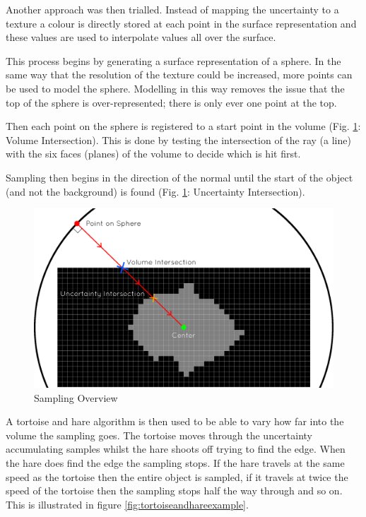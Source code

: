 Another approach was then trialled. Instead of mapping the uncertainty to a texture a colour is directly stored at each point in the surface representation and these values are used to interpolate values all over the surface.

This process begins by generating a surface representation of a sphere. In the same way that the resolution of the texture could be increased, more points can be used to model the sphere. Modelling in this way removes the issue that the top of the sphere is over-represented; there is only ever one point at the top.

Then each point on the sphere is registered to a start point in the volume (Fig. \ref{fig:surface_sampling_example}: Volume Intersection). This is done by testing the intersection of the ray (a line) with the six faces (planes) of the volume to decide which is hit first.

Sampling then begins in the direction of the normal until the start of the object (and not the background) is found (Fig. \ref{fig:surface_sampling_example}: Uncertainty Intersection).

\begin{figure}[H]
  \centering
  \includegraphics[width=\textwidth]{images/surface/sampling_example.png}
  \caption{Sampling Overview}\label{fig:surface_sampling_example}
\end{figure}

A tortoise and hare algorithm is then used to be able to vary how far into the volume the sampling goes. The tortoise moves through the uncertainty accumulating samples whilst the hare shoots off trying to find the edge. When the hare does find the edge the sampling stops. If the hare travels at the same speed as the tortoise then the entire object is sampled, if it travels at twice the speed of the tortoise then the sampling stops half the way through and so on. This is illustrated in figure \ref{fig:tortoiseandhareexample}.

